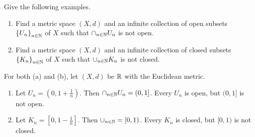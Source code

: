 \documentclass{article}
\begin{document}
\begin{prob}
    Give the following examples.
    \begin{enumerate}[label=(\alph*)]
        \item Find a metric space $(X,d)$ and an infinite collection of open subsets $ \left\{ U_n \right\}_{n \in \mathbb{N}}$ of $X$ such that $\cap_{n \in \mathbb{N}} U_n$ is not open.
        \item Find a metric space $(X, d)$ and an infinite collection of closed subsets $ \left\{ K_n \right\}_{n \in \mathbb{N}}$ of $X$ such that $\cup_{n \in \mathbb{N}} K_n$ is not closed.
    \end{enumerate}
\end{prob}

For both (a) and (b), let $(X, d)$ be $\mathbb{R}$ with the Euclidean metric.
\begin{enumerate}[label=(\alph*)]
    \item Let $U_n = \left( 0, 1 + \frac{1}{n} \right) $. Then $\cap_{n \in \mathbb{N}} U_n = (0, 1]$. Every $U_n$ is open, but $(0, 1]$ is not open.
    \item Let $K_n = \left[ 0, 1 - \frac{1}{n} \right]$. Then $\cup_{n \in \mathbb{N}} = [0, 1)$. Every $K_n$ is closed, but $[0, 1)$ is not closed.
\end{enumerate}


\end{document}
